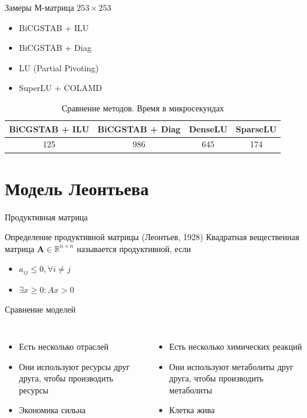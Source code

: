 \documentclass[aspectratio=169]{beamer}
\begin{document}
\begin{frame}{Замеры}
М-матрица $253 \times 253$
\begin{itemize}
	\item BiCGSTAB + ILU
	\item BiCGSTAB + Diag
	\item LU (Partial Pivoting)
	\item SuperLU + COLAMD
\end{itemize}
\begin{table}[b]
	\centering
	\caption{Сравнение методов. Время в микросекундах\label{methods_benchmark}}
	\begin{tabular}{c|c|c|c}
		\hline
		BiCGSTAB + ILU & BiCGSTAB + Diag & DenseLU & SparseLU\\
		\hline
		125 & 986 & 645 & 174\\
	\end{tabular}
\end{table}
\end{frame}

\section{Модель Леонтьева}
\begin{frame}{Продуктивная матрица}
\begin{block}{Определение продуктивной матрицы (Леонтьев, 1928)}
	Квадратная вещественная матрица $\mathbf{A} \in \mathbb{R}^{n \times n}$ называется продуктивной, если
	\begin{itemize}
		\item $a_{ij} \leq 0, \forall i \neq j$
		\item $\exists x \geq 0 : Ax > 0$
	\end{itemize}
\end{block}
\end{frame}

\begin{frame}{Сравнение моделей}
\begin{columns}[T]
	\begin{itemize}
		\item Есть несколько отраслей
		\item Они используют ресурсы друг друга, чтобы производить ресурсы
		\item Экономика сильна
	\end{itemize}

	\begin{itemize}
		\item Есть несколько химических реакций
		\item Они используют метаболиты друг друга, чтобы производить метаболиты
		\item Клетка жива
	\end{itemize}
\end{columns}
\end{frame}
\end{document}
